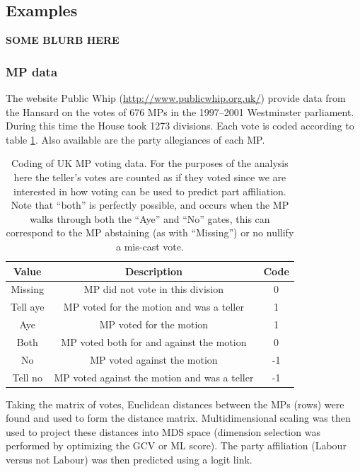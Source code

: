 

%
\subsection{Examples}

\textbf{SOME BLURB HERE}


\subsubsection{MP data}


The website Public Whip (\url{http://www.publicwhip.org.uk/}) provide data from the Hansard on the votes of 676 MPs in the 1997--2001 Westminster parliament. During this time the House took 1273 divisions. Each vote is coded according to table \ref{voting-code}. Also available are the party allegiances of each MP. 


\begin{table}  
\begin{centering}
\begin{tabular}{ccc}
    Value & Description & Code \\ 
    \hline
    Missing & MP did not vote in this division & 0 \\ 
    Tell aye & MP voted for the motion and was a teller & 1 \\ 
    Aye & MP voted for the motion & 1 \\ 
    Both & MP voted both for  and against the motion & 0 \\ 
    No & MP voted against the motion & -1 \\ 
    Tell no & MP voted against the motion and was a teller & -1 \\ 
  \end{tabular}
\caption{Coding of UK MP voting data. For the purposes of the analysis here the teller's votes are counted as if they voted since we are interested in how voting can be used to predict part affiliation. Note that ``both'' is perfectly possible, and occurs when the MP walks through both the ``Aye'' and ``No'' gates, this can correspond to the MP abstaining (as with ``Missing'') or no nullify a mis-cast vote.}
\end{centering}
\label{voting-code}
\end{table}

Taking the matrix of votes, Euclidean distances between the MPs (rows) were found and used to form the distance matrix. Multidimensional scaling was then used to project these distances into MDS space (dimension selection was performed by optimizing the GCV or ML score). The party affiliation (Labour versus not Labour) was then predicted using a logit link.

